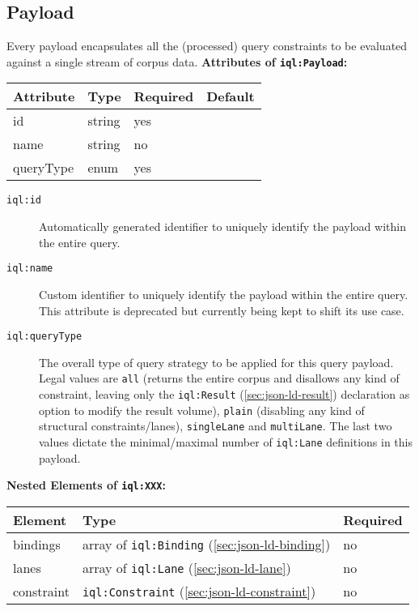 \documentclass[11pt]{article}
\newcommand{\iqlns}{iql:}
\newcommand{\iqlType}[1]{\texttt{\iqlns#1}}
\newcommand{\desc}[1]{\noindent#1\newline\medskip}
\newenvironment{attributes}[1]{
\noindent\textbf{Attributes of #1:}\newline\medskip
\begin{tabular}{|p{0.3\textwidth}|p{0.20\textwidth}|p{0.20\textwidth}|p{0.17\textwidth}|}
	\hline
	\textbf{Attribute} & \textbf{Type} & \textbf{Required} & \textbf{Default} \\ 
	\hline
	\hline
}{
\end{tabular}
}
\newcommand{\attribute}[4]{
	#1 & #2 & #3 & #4 \\
	\hline
}
\newenvironment{elements}[1]{
\noindent\textbf{Nested Elements of #1:}\newline\medskip
\begin{tabular}{|p{0.3\textwidth}|p{0.42\textwidth}|p{0.17\textwidth}|}
	\hline
	\textbf{Element} & \textbf{Type} & \textbf{Required} \\ 
	\hline
	\hline
}{
\end{tabular}
}
\newcommand{\element}[3]{
#1 & #2 & #3 \\
\hline
}
\begin{document}
\subsection{Payload}
\label{sec:json-ld-payload}
\desc{Every payload encapsulates all the (processed) query constraints to be evaluated against a single stream of corpus data.}
\begin{attributes}{\iqlType{Payload}}
	\attribute{id}{string}{yes}{}
	\attribute{name}{string}{no}{}
	\attribute{queryType}{enum}{yes}{}
\end{attributes}
\begin{description}
	\item[\iqlType{id}] Automatically generated identifier to uniquely identify the payload within the entire query.
	\item[\iqlType{name}] Custom identifier to uniquely identify the payload within the entire query. This attribute is deprecated but currently being kept to shift its use case.
	\item[\iqlType{queryType}] The overall type of query strategy to be applied for this query payload. Legal values are \texttt{all} (returns the entire corpus and disallows any kind of constraint, leaving only the \iqlType{Result} (\ref{sec:json-ld-result}) declaration as option to modify the result volume), \texttt{plain} (disabling any kind of structural constraints/lanes), \texttt{singleLane} and \texttt{multiLane}. The last two values dictate the minimal/maximal number of \iqlType{Lane} definitions in this payload.
\end{description}
\begin{elements}{\iqlType{XXX}}
	\element{bindings}{array of \iqlType{Binding} (\ref{sec:json-ld-binding})}{no}
	\element{lanes}{array of \iqlType{Lane} (\ref{sec:json-ld-lane})}{no}
	\element{constraint}{\iqlType{Constraint} (\ref{sec:json-ld-constraint})}{no}
\end{elements}
\end{document}
